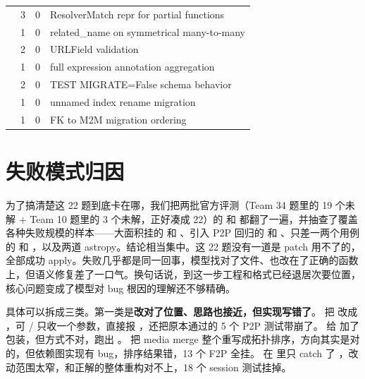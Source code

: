 \documentclass[UTF8,a4paper,11pt]{ctexart}
\begin{document}
\begin{center}
{\begin{longtable}{L{4.1cm} C{1.6cm} C{1.7cm} L{7.0cm}}
 & 3 & 0 & ResolverMatch repr for partial functions \\
 & 1 & 0 & related\_name on symmetrical many-to-many \\
 & 2 & 0 & URLField validation \\
 & 1 & 0 & full expression annotation aggregation \\
 & 2 & 0 & TEST MIGRATE=False schema behavior \\
 & 1 & 0 & unnamed index rename migration \\
 & 1 & 0 & FK to M2M migration ordering \\
\bottomrule
\end{longtable}
}
\end{center}

\section{失败模式归因}

为了搞清楚这 22 题到底卡在哪，我们把两批官方评测（Team 34 题里的 19 个未解 + Team 10 题里的 3 个未解，正好凑成 22）的  和  都翻了一遍，并抽查了覆盖各种失败规模的样本——大面积挂的  和 、引入 P2P 回归的  和 、只差一两个用例的  和 ，以及两道 astropy。结论相当集中。这 22 题没有一道是 patch 用不了的，全部成功 apply。失败几乎都是同一回事，模型找对了文件、也改在了正确的函数上，但语义修复差了一口气。换句话说，到这一步工程和格式已经退居次要位置，核心问题变成了模型对 bug 根因的理解还不够精确。

具体可以拆成三类。第一类是\textbf{改对了位置、思路也接近，但实现写错了}。 把  改成 ，可 / 只收一个参数，直接报 ，还把原本通过的 5 个 P2P 测试带崩了。 给  加了  包装，但方式不对，跑出 。 把 media merge 整个重写成拓扑排序，方向其实是对的，但依赖图实现有 bug，排序结果错，13 个 F2P 全挂。 在  里只 catch 了 ，改动范围太窄，和正解的整体重构对不上，18 个 session 测试挂掉。
\end{document}
